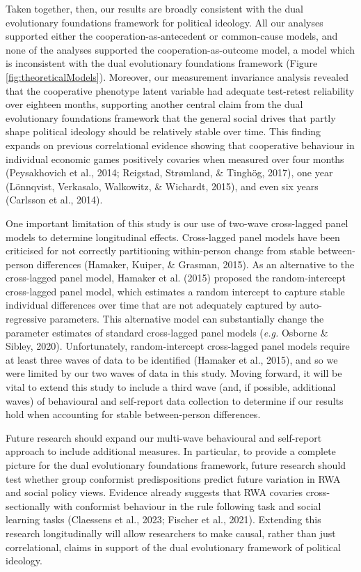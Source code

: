 \documentclass[
  man,floatsintext]{apa6}
\begin{document}
Taken together, then, our results are broadly consistent with the dual evolutionary foundations framework for political ideology. All our analyses supported either the cooperation-as-antecedent or common-cause models, and none of the analyses supported the cooperation-as-outcome model, a model which is inconsistent with the dual evolutionary foundations framework (Figure \ref{fig:theoreticalModels}). Moreover, our measurement invariance analysis revealed that the cooperative phenotype latent variable had adequate test-retest reliability over eighteen months, supporting another central claim from the dual evolutionary foundations framework that the general social drives that partly shape political ideology should be relatively stable over time. This finding expands on previous correlational evidence showing that cooperative behaviour in individual economic games positively covaries when measured over four months (Peysakhovich et al., 2014; Reigstad, Strømland, \& Tinghög, 2017), one year (Lönnqvist, Verkasalo, Walkowitz, \& Wichardt, 2015), and even six years (Carlsson et al., 2014).

One important limitation of this study is our use of two-wave cross-lagged panel models to determine longitudinal effects. Cross-lagged panel models have been criticised for not correctly partitioning within-person change from stable between-person differences (Hamaker, Kuiper, \& Grasman, 2015). As an alternative to the cross-lagged panel model, Hamaker et al. (2015) proposed the random-intercept cross-lagged panel model, which estimates a random intercept to capture stable individual differences over time that are not adequately captured by auto-regressive parameters. This alternative model can substantially change the parameter estimates of standard cross-lagged panel models (\emph{e.g.} Osborne \& Sibley, 2020). Unfortunately, random-intercept cross-lagged panel models require at least three waves of data to be identified (Hamaker et al., 2015), and so we were limited by our two waves of data in this study. Moving forward, it will be vital to extend this study to include a third wave (and, if possible, additional waves) of behavioural and self-report data collection to determine if our results hold when accounting for stable between-person differences.

Future research should expand our multi-wave behavioural and self-report approach to include additional measures. In particular, to provide a complete picture for the dual evolutionary foundations framework, future research should test whether group conformist predispositions predict future variation in RWA and social policy views. Evidence already suggests that RWA covaries cross-sectionally with conformist behaviour in the rule following task and social learning tasks (Claessens et al., 2023; Fischer et al., 2021). Extending this research longitudinally will allow researchers to make causal, rather than just correlational, claims in support of the dual evolutionary framework of political ideology.
\end{document}
